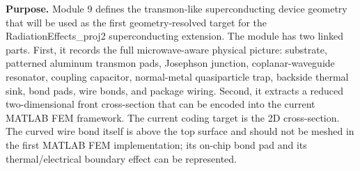 \documentclass[11pt]{article}
\begin{document}

\begin{overviewbox}
\textbf{Purpose.} Module 9 defines the transmon-like superconducting device geometry that will be used as the first geometry-resolved target for the RadiationEffects\_proj2 superconducting extension. The module has two linked parts. First, it records the full microwave-aware physical picture: substrate, patterned aluminum transmon pads, Josephson junction, coplanar-waveguide resonator, coupling capacitor, normal-metal quasiparticle trap, backside thermal sink, bond pads, wire bonds, and package wiring. Second, it extracts a reduced two-dimensional front cross-section that can be encoded into the current MATLAB FEM framework. The current coding target is the 2D cross-section. The curved wire bond itself is above the top surface and should not be meshed in the first MATLAB FEM implementation; its on-chip bond pad and its thermal/electrical boundary effect can be represented.
\end{overviewbox}

\ProjectTOC
\end{document}
